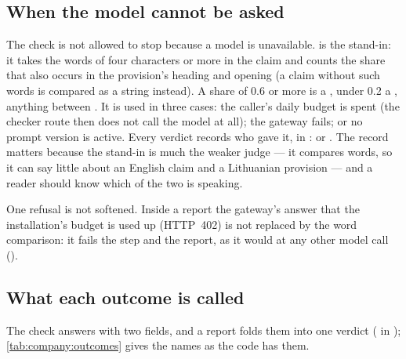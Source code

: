 \subsection{When the model cannot be asked}\label{sec:company:overlap}

The check is not allowed to stop because a model is unavailable.  is the
stand-in: it takes the words of four characters or more in the claim and counts the share that
also occurs in the provision's heading and opening (a claim without such words is compared as
a string instead). A share of 0.6 or more is a , under 0.2 a ,
anything between . It is used in three cases: the
caller's daily budget is spent (the checker route then does not call the model at all); the
gateway fails; or no prompt version is active. Every verdict records who gave it, in
:  or . The record matters because the stand-in is
much the weaker judge --- it compares words, so it can say little about an English claim and
a Lithuanian provision --- and a reader should know which of the two is speaking.

One refusal is not softened. Inside a report the gateway's answer that the installation's
budget is used up (HTTP~402) is not replaced by the word comparison: it fails the step and the
report, as it would at any other model call ().

\subsection{What each outcome is called}\label{sec:company:outcomes}

The check answers with two fields, and a report folds them into one verdict
( in ); \cref{tab:company:outcomes}
gives the names as the code has them.

